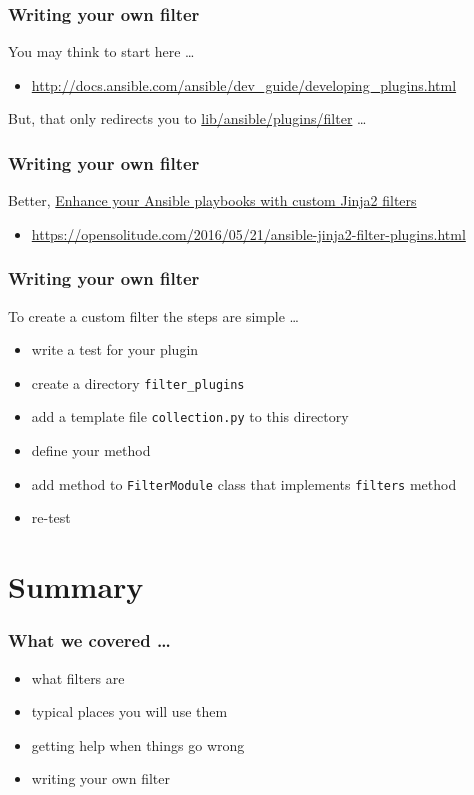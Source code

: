 \documentclass[pdf]{beamer}
\begin{document}
\begin{frame}
  \frametitle{Writing your own filter}
  You may think to start here \ldots
  \begin{itemize}
    \item \small \url{http://docs.ansible.com/ansible/dev_guide/developing_plugins.html}
  \end{itemize}
  \pause{}
  But, that only redirects you to
  \href{https://github.com/ansible/ansible/blob/devel/lib/ansible/plugins/filter/core.py}{lib/ansible/plugins/filter} \ldots
\end{frame}

\begin{frame}
  \frametitle{Writing your own filter}
  Better, \href{https://opensolitude.com/2016/05/21/ansible-jinja2-filter-plugins.html}{Enhance your Ansible playbooks with custom Jinja2 filters}
  \begin{itemize}
    \item \small \url{https://opensolitude.com/2016/05/21/ansible-jinja2-filter-plugins.html}
  \end{itemize}
\end{frame}

\begin{frame}
  \frametitle{Writing your own filter}
  To create a custom filter the steps are simple \ldots
  \begin{itemize}
    \item write a test for your plugin
      \pause{}
    \item create a directory \texttt{filter\_plugins}
      \pause{}
    \item add a template file \texttt{collection.py} to this directory
      \pause{}
    \item define your method
      \pause{}
    \item add method to \texttt{FilterModule} class that implements \texttt{filters} method
      \pause{}
    \item re-test
  \end{itemize}
\end{frame}

\section{Summary}

\begin{frame}
  \frametitle{What we covered \ldots}
    \pause{}
  \begin{itemize}
    \item{what filters are}
      \pause{}
    \item{typical places you will use them}
      \pause{}
    \item{getting help when things go wrong}
      \pause{}
    \item{writing your own filter}
  \end{itemize}
\end{frame}
\end{document}
